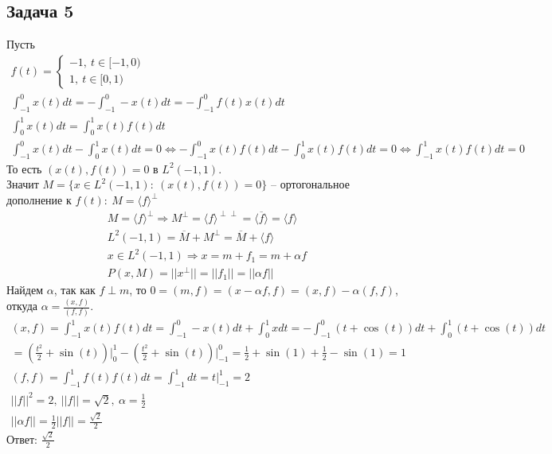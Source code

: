 \subsection*{Задача 5}
	Пусть
	\begin{gather*}
		f(t) =
		\begin{cases}
			-1,\ t \in [-1,0)\\
			1,\ t \in [0,1)
		\end{cases}\\
	\int_{-1}^{0} x(t) dt
	= -\int_{-1}^{0} -x(t)dt
	= -\int_{-1}^{0} f(t) x(t) dt\\
	\int_{0}^{1} x(t)dt
	= \int_{0}^{1} x(t) f(t) dt\\
	\int_{-1}^{0} x(t) dt - \int_{0}^{1} x(t) dt = 0 \Leftrightarrow
	-\int_{-1}^{0} x(t) f(t) dt - \int_{0}^{1} x(t) f(t) dt = 0 \Leftrightarrow
	\int_{-1}^{1} x(t) f(t) dt = 0
	\end{gather*}
	То есть $(x(t), f(t)) = 0$ в $L^2(-1,1)$.\\
	Значит $M = \{x \in L^2(-1,1):\ (x(t),f(t)) = 0\}$ -- ортогональное дополнение к $f(t):\ M = \langle f \rangle^{\perp}$
	\begin{gather*}
		M = \langle f \rangle^{\perp}
		\Rightarrow M^{\perp} = \langle f \rangle^{\perp \perp} = \langle \overline{f} \rangle = \langle f \rangle\\
		L^2(-1,1) = \overline{M} + M^{\perp}
		= \overline{M} + \langle f \rangle\\
		x \in L^2(-1,1) \Rightarrow
		x = m + f_1 = m + \alpha f\\
		P(x, M) = ||x^{\perp}|| = ||f_1|| = ||\alpha f|| 
	\end{gather*}
	Найдем $\alpha$, так как $f \perp m$, то $0 = (m, f) = (x - \alpha f, f) = (x, f) - \alpha(f,f)$, откуда $\alpha = \frac{(x, f)}{(f, f)}$.
	\begin{gather*}
		(x,f) = \int_{-1}^{1} x(t)f(t)dt
		= \int_{-1}^{0} -x(t)dt + \int_{0}^{1} xdt
		= -\int_{-1}^{0} (t + \cos(t))dt + \int_{0}^{1}(t + \cos(t)) dt\\
		= \left( \frac{t^2}{2} + \sin(t) \right)\bigg|_{0}^{1} - \left(\frac{t^2}{2} + \sin(t)\right)\bigg|_{-1}^{0}
		= \frac{1}{2} + \sin(1) + \frac{1}{2} - \sin(1) = 1\\
		(f,f) = \int_{-1}^{1} f(t)f(t) dt
		= \int_{-1}^{1} dt = t\bigg|_{-1}^{1} = 2\\
		||f||^2 = 2,\ ||f|| = \sqrt{2},\ \alpha = \frac{1}{2}\\
		||\alpha f|| = \frac{1}{2}||f|| = \frac{\sqrt{2}}{2}
	\end{gather*}
	Ответ: $\frac{\sqrt{2}}{2}$
\vskip 0.4in


